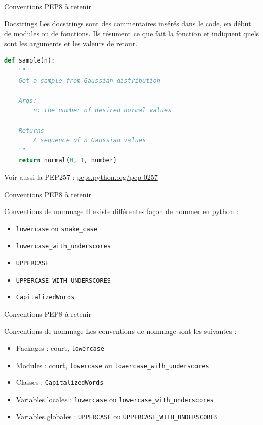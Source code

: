 \documentclass[10pt]{beamer}
\begin{document}
\begin{frame}[fragile]{Conventions PEP8 à retenir}
  \begin{block}{Docstrings}
    \medskip
    Les docstrings sont des commentaires insérés dans le code, en début de modules ou de fonctions.
    Ils résument ce que fait la fonction et indiquent quels sont les arguments et les valeurs de retour.
  \end{block}

\begin{lstlisting}[language=python, numbers=none]
def sample(n):
    """
    Get a sample from Gaussian distribution

    Args:
        n: the number of desired normal values

    Returns
        A sequence of n Gaussian values
    """
    return normal(0, 1, number)
\end{lstlisting}

  Voir aussi la PEP257 : \url{peps.python.org/pep-0257}
\end{frame}

\begin{frame}{Conventions PEP8 à retenir}
  \begin{block}{Conventions de nommage}
    \medskip
    Il existe différentes façon de nommer en python :
    \begin{itemize}
      \item \texttt{lowercase} ou \texttt{snake\_case}
      \item \texttt{lowercase\_with\_underscores}
      \item \texttt{UPPERCASE}
      \item \texttt{UPPERCASE\_WITH\_UNDERSCORES}
      \item \texttt{CapitalizedWords}
    \end{itemize}
  \end{block}
\end{frame}


\begin{frame}{Conventions PEP8 à retenir}
  \begin{block}{Conventions de nommage}
    \medskip
    Les conventions de nommage sont les suivantes :
    \begin{itemize}
      \item Packages : court, \texttt{lowercase}
      \item Modules : court, \texttt{lowercase} ou \texttt{lowercase\_with\_underscores}
      \item Classes : \texttt{CapitalizedWords}
      \item Variables locales : \texttt{lowercase} ou \texttt{lowercase\_with\_underscores}
      \item Variables globales : \texttt{UPPERCASE} ou \texttt{UPPERCASE\_WITH\_UNDERSCORES}
    \end{itemize}

  \end{block}
\end{frame}
\end{document}
